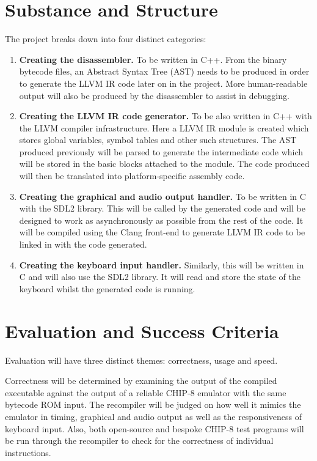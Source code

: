\documentclass[12pt,a4paper,twoside]{article}
\begin{document}
\section*{Substance and Structure}

The project breaks down into four distinct categories:

\begin{enumerate}

\item \textbf{Creating the disassembler.} To be written in C++. From the binary bytecode files, an Abstract Syntax Tree (AST) needs to be produced in order to generate the LLVM IR code later on in the project. More human-readable output will also be produced by the disassembler to assist in debugging.

\item \textbf{Creating the LLVM IR code generator.} To be also written in C++ with the LLVM compiler infrastructure. Here a LLVM IR module is created which stores global variables, symbol tables and other such structures. The AST produced previously will be parsed to generate the intermediate code which will be stored in the basic blocks attached to the module. The code produced will then be translated into platform-specific assembly code.

\item \textbf{Creating the graphical and audio output handler.} To be written in C with the SDL2 library. This will be called by the generated code and will be designed to work as asynchronously as possible from the rest of the code. It will be compiled using the Clang front-end to generate LLVM IR code to be linked in with the code generated.

\item \textbf{Creating the keyboard input handler.} Similarly, this will be written in C and will also use the SDL2 library. It will read and store the state of the keyboard whilst the generated code is running.

\end{enumerate}

\section*{Evaluation and Success Criteria}

Evaluation will have three distinct themes: correctness, usage and speed. 

Correctness will be determined by examining the output of the compiled executable against the output of a reliable CHIP-8 emulator with the same bytecode ROM input. The recompiler will be judged on how well it mimics the emulator in timing, graphical and audio output as well as the responsiveness of keyboard input. Also, both open-source and bespoke CHIP-8 test programs will be run through the recompiler to check for the correctness of individual instructions.
\end{document}
